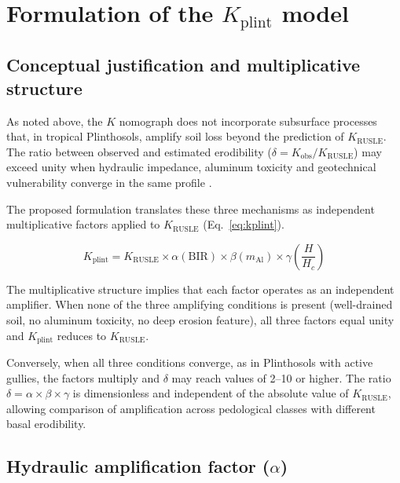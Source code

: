 \documentclass[preprint,review,12pt,authoryear]{elsarticle}
\begin{document}
\section{Formulation of the $K_{\mathrm{plint}}$ model}
\label{sec:model}

\subsection{Conceptual justification and multiplicative structure}

As noted above, the $K$ nomograph does not incorporate subsurface processes that, in tropical Plinthosols, amplify soil loss beyond the prediction of $K_{\mathrm{RUSLE}}$. The ratio between observed and estimated erodibility ($\delta = K_{\mathrm{obs}}/K_{\mathrm{RUSLE}}$) may exceed unity when hydraulic impedance, aluminum toxicity and geotechnical vulnerability converge in the same profile \citep{poesen_2018}.

The proposed formulation translates these three mechanisms as independent multiplicative factors applied to $K_{\mathrm{RUSLE}}$ (Eq.~\ref{eq:kplint}).

\begin{equation}
K_{\mathrm{plint}} = K_{\mathrm{RUSLE}} \times \alpha(\mathrm{BIR}) \times \beta(m_{\mathrm{Al}}) \times \gamma\!\left(\frac{H}{H_c}\right)
\label{eq:kplint}
\end{equation}

The multiplicative structure implies that each factor operates as an independent amplifier. When none of the three amplifying conditions is present (well-drained soil, no aluminum toxicity, no deep erosion feature), all three factors equal unity and $K_{\mathrm{plint}}$ reduces to $K_{\mathrm{RUSLE}}$.

Conversely, when all three conditions converge, as in Plinthosols with active gullies, the factors multiply and $\delta$ may reach values of 2--10 or higher. The ratio $\delta = \alpha \times \beta \times \gamma$ is dimensionless and independent of the absolute value of $K_{\mathrm{RUSLE}}$, allowing comparison of amplification across pedological classes with different basal erodibility.

\subsection{Hydraulic amplification factor ($\alpha$)}
\end{document}
